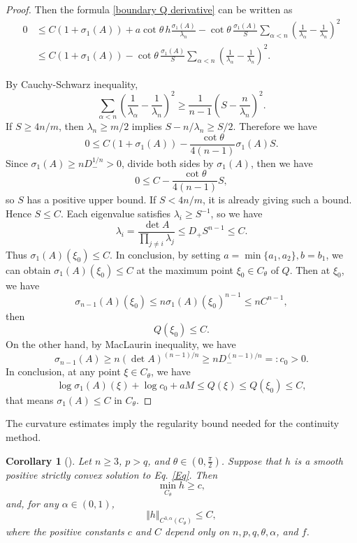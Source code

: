\documentclass[11pt]{amsart}
\numberwithin{equation} {section}
\numberwithin{equation}{section}
\newtheorem{corollary}[theorem]{\bf Corollary}
\begin{document}
\begin{proof}
Then the formula \eqref{boundary Q derivative} can be written as
\begin{equation}\label{boundary inequality} 
\begin{split}
        0&\leq 
        C(1+\sigma_1(A))
        +a\cot\theta\,h\frac{\sigma_1(A)}{\lambda_n}-\cot\theta\,\frac{\sigma_1(A)}{S}
        \sum_{\alpha<n}\left(\frac1{\lambda_{\alpha}}
        -\frac1{\lambda_n}\right)^2\\
        &\leq 
        C(1+\sigma_1(A))-\cot\theta\,\frac{\sigma_1(A)}{S}
        \sum_{\alpha<n}\left(\frac1{\lambda_{\alpha}}
        -\frac1{\lambda_n}\right)^2.
\end{split}
\end{equation}

By Cauchy-Schwarz inequality,
\[
        \sum_{\alpha<n}\left(\frac1{\lambda_{\alpha}}
        -\frac1{\lambda_n}\right)^2
        \geq\frac1{n-1}\left(S-\frac n{\lambda_n}\right)^2.
\]
If $S\geq4n/m$, then $\lambda_n\geq m/2$ implies
$S-n/\lambda_n\geq S/2$. Therefore we have
\begin{equation}\label{s4-4}
        0\leq C(1+\sigma_1(A))
        -\frac{\cot\theta}{4(n-1)}\sigma_1(A)S.
\end{equation}
Since $\sigma_1(A)\geq nD_-^{1/n}>0$, divide both sides by $\sigma_1(A)$, then we have
$$0\leq C - \frac{\cot\theta}{4(n-1)}S,$$
so $S$ has a positive upper bound. If $S<4n/m$, it is already giving such a bound.
Hence $S\leq C$. Each eigenvalue satisfies
$\lambda_i\geq S^{-1}$, so we have
\[
        \lambda_i
        =\frac{\det A}{\prod_{j\ne i}\lambda_j}
        \leq D_+S^{n-1}\leq C.
\]
Thus $\sigma_1(A)(\xi_0)\leq C$. In conclusion, by setting $a=\min\{a_1, a_2\}, b=b_1$, we can obtain $\sigma_1(A)(\xi_0)\leq C$ at the maximum point $\xi_0\in C_{\theta}$ of $Q$. Then at $\xi_0$, we have 
$$\sigma_{n-1}(A)(\xi_0)\leq n\sigma_1(A)(\xi_0)^{n-1}\leq nC^{n-1},$$
then 
$$Q(\xi_0)\leq C.$$
On the other hand, by MacLaurin inequality, we have
$$\sigma_{n-1}(A)\geq n(\det A)^{(n-1)/n}\geq nD^{(n-1)/n}_-=: c_0>0.$$
In conclusion, at any point $\xi\in C_{\theta}$, we have 
$$\log \sigma_1(A)(\xi) + \log c_0 +aM\leq Q(\xi)\leq Q(\xi_0)\leq C,$$
that means $\sigma_1(A)\leq C$ in $C_{\theta}$.
\end{proof}

The curvature estimates imply the regularity bound needed for the continuity method.

\begin{corollary}[]\label{c2 theorem}
Let $n\geq 3$, $p>q$, and $\theta\in (0,\frac{\pi}{2})$. Suppose that $h$ is a
smooth positive strictly convex solution to Eq. \eqref{Eq}. Then
\[
        \min_{C_{\theta}}h\geq c,
\]
and, for any $\alpha\in(0,1)$,
\[
        \Vert h\Vert_{C^{3,\alpha}(C_{\theta})}\leq C,
\]
where the positive constants $c$ and $C$ depend only on
$n,p,q,\theta,\alpha$, and $f$.
\end{corollary}
\end{document}
